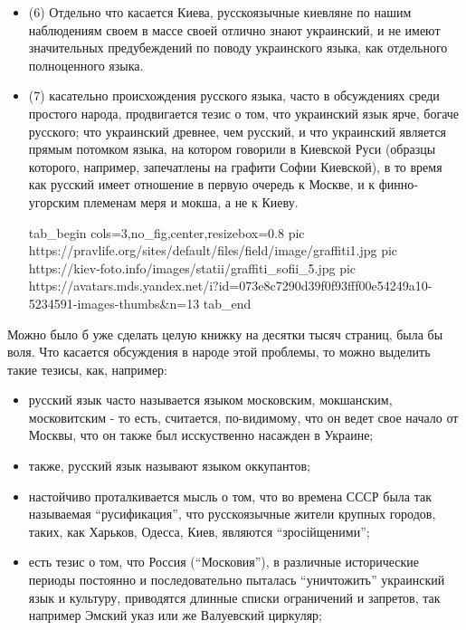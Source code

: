 \begin{itemize}
\item (6) Отдельно что касается Киева, русскоязычные киевляне по нашим
наблюдениям своем в массе своей отлично знают украинский, и не имеют
значительных предубеждений по поводу украинского языка, как отдельного
полноценного языка.

\item (7) касательно происхождения русского языка, часто в обсуждениях среди
простого народа, продвигается тезис о том, что украинский язык ярче, богаче
русского; что украинский древнее, чем русский, и что украинский является прямым
потомком языка, на котором говорили в Киевской Руси (образцы которого,
например, запечатлены на графити Софии Киевской), в то время как русский имеет
отношение в первую очередь к Москве, и к финно-угорским племенам меря и мокша,
а не к Киеву.

\ifcmt
  tab_begin cols=3,no_fig,center,resizebox=0.8
     pic https://pravlife.org/sites/default/files/field/image/graffiti1.jpg
     pic https://kiev-foto.info/images/statii/graffiti_sofii_5.jpg
     pic https://avatars.mds.yandex.net/i?id=073e8c7290d39f0f93fff00e54249a10-5234591-images-thumbs&n=13
  tab_end
\fi

\end{itemize} %

Можно было б уже сделать целую книжку на десятки тысяч страниц, была
бы воля. Что касается обсуждения в народе этой проблемы, то можно выделить такие тезисы, как, например:

\begin{itemize} %
\item русский язык часто называется языком московским, мокшанским, московитским - то есть, считается, по-видимому,
что он ведет свое начало от Москвы, что он также был исскуственно насажден в Украине;
\item также, русский язык называют языком оккупантов;
\item настойчиво проталкивается мысль о том, что во времена СССР была так
называемая \enquote{русификация}, что русскоязычные жители крупных городов,
таких, как Харьков, Одесса, Киев, являются \enquote{зросійщеними};
\item есть тезис о том, что Россия (\enquote{Московия}), в различные
исторические периоды постоянно и последовательно пыталась
\enquote{уничтожить} украинский язык и культуру, приводятся длинные
списки ограничений и запретов, так например Эмский указ или же
Валуевский циркуляр;
\end{itemize} %

